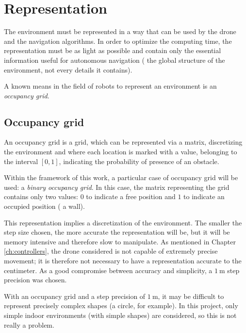 \section{Representation}

The environment must be represented in a way that can be used by the drone and the navigation algorithms. In order to optimize the computing time, the representation must be as light as possible and contain only the essential information useful for autonomous navigation (\ie{} the global structure of the environment, not every details it contains).

A known means in the field of robots to represent an environment is an \emph{occupancy grid}.

\subsection{Occupancy grid}\label{sec:05.occupancy.grid}

An occupancy grid \cite{wikipedia2021occupancygridmapping} is a grid, which can be represented via a matrix, discretizing the environment and where each location is marked with a value, belonging to the interval $[0, 1]$, indicating the probability of presence of an obstacle.

Within the framework of this work, a particular case of occupancy grid will be used: a \emph{binary occupancy grid}. In this case, the matrix representing the grid contains only two values: $0$ to indicate a free position and $1$ to indicate an occupied position (\eg{} a wall).

This representation implies a discretization of the environment. The smaller the step size chosen, the more accurate the representation will be, but it will be memory intensive and therefore slow to manipulate. As mentioned in Chapter \ref{ch:controllers}, the drone considered is not capable of extremely precise movement; it is therefore not necessary to have a representation accurate to the centimeter. As a good compromise between accuracy and simplicity, a $\SI{1}{\meter}$ step precision was chosen.

\begin{note}
    With an occupancy grid and a step precision of $\SI{1}{\meter}$, it may be difficult to represent precisely complex shapes (a circle, for example). In this project, only simple indoor environments (with simple shapes) are considered, so this is not really a problem.
\end{note}

